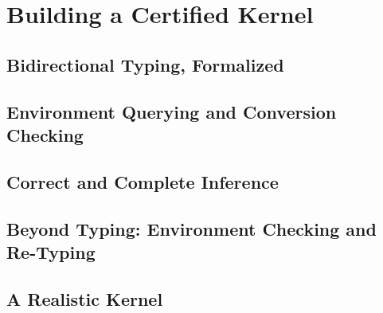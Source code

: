 \chapter{Building a Certified Kernel}
\label{chap:kernel-correctness}

\margintoc

\section{Bidirectional Typing, Formalized}

\section{Environment Querying and Conversion Checking}

\section{Correct and Complete Inference}

\section{Beyond Typing: Environment Checking and Re-Typing}

\section{A Realistic Kernel}